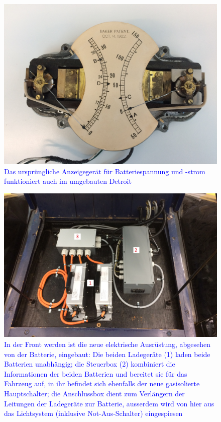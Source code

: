 \begin{landscape}
\begin{figure}[h]
		\includegraphics[width=1.30\textwidth]{images/Anhang/Volt_Ampere.jpg}
	\caption{\textcolor{blue}{Das ursprüngliche Anzeigegerät für Batteriespannung und -strom funktioniert auch im umgebauten Detroit}}
	\label{fig:Volt_Ampere}
\end{figure}
\begin{figure}[h]
	\centering
		\includegraphics[width=1.30\textwidth]{images/Anhang/Front.jpg}
	\caption{\textcolor{blue}{In der Front werden ist die neue elektrische Ausrüstung, abgesehen von der Batterie, eingebaut: Die beiden Ladegeräte (1) laden beide Batterien unabhängig; die Steuerbox (2) kombiniert die Informationen der beiden Batterien und bereitet sie für das Fahrzeug auf, in ihr befindet sich ebenfalls der neue gasisolierte Hauptschalter; die Anschlussbox dient zum Verlängern der Leitungen der Ladegeräte zur Batterie, ausserdem wird von hier aus das Lichtsystem (inklusive Not-Aus-Schalter) eingespiesen}}
	\label{fig:Front}
\end{figure}
	\end{landscape}

